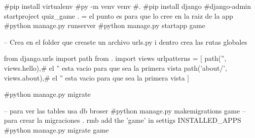 #pip install virtualenv
#py -m venv venv
#.\venv\Scripts\Activate
#pip install django
#django-admin startproject quiz_game . = el punto es para que lo cree en la raiz de la app
#python manage.py runserver
#python manage.py startapp game

-- Crea en el folder que creaste un archivo urls.py i dentro crea las rutas globales 

from django.urls import path
from . import views
urlpatterns = [
    path('', views.hello),# el  '' esta vacio para que sea la primera vista 
    path('about/', views.about),# el  '' esta vacio para que sea la primera vista 
]

#python manage.py migrate

-- para ver las tables usa db broser 
#python manage.py makemigrations game  -- para crear la migraciones . rmb add the 'game' in settigs INSTALLED_APPS
#python manage.py migrate game  
